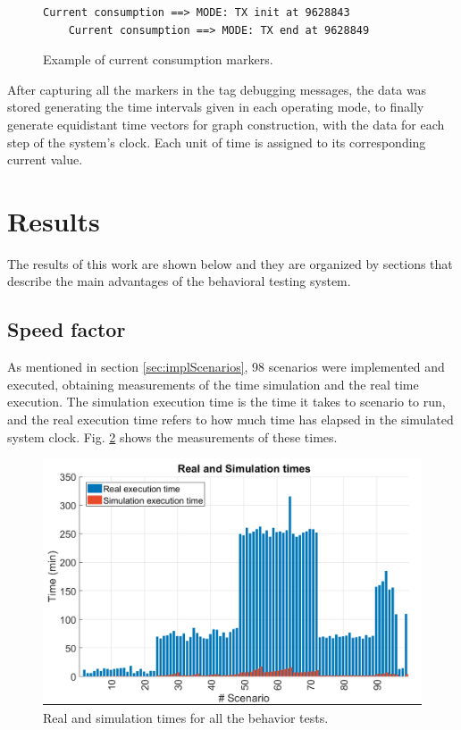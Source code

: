 \documentclass[journal]{IEEEtran}	%
\begin{document}
\begin{figure}[t!]
\centering
\begin{lstlisting}[style=scenarioStyle]
    Current consumption ==> MODE: TX init at 9628843
    Current consumption ==> MODE: TX end at 9628849
\end{lstlisting}
\caption{Example of current consumption markers.}
\label{fig:markers}
\end{figure}

After capturing all the markers in the tag debugging messages, the data was stored generating the time intervals given in each operating mode, to finally generate equidistant time vectors for graph construction, with the data for each step of the system's clock. Each unit of time is assigned to its corresponding current value.


\section{Results}


The results of this work are shown below and they are organized by sections that describe the main advantages of the behavioral testing system.


\subsection{Speed factor}


As mentioned in section \ref{sec:implScenarios}, 98 scenarios were implemented and executed, obtaining measurements of the time simulation and the real time execution. The simulation execution time is the time it takes to scenario to run, and the real execution time refers to how much time has elapsed in the simulated system clock. Fig. \ref{fig:scenarios1} shows the measurements of these times.

\begin{figure}[t!]
\centering
\includegraphics[width=0.95\columnwidth]{scenarios4.png}
\caption{Real and simulation times for all the behavior tests.}
\label{fig:scenarios1}
\end{figure}
\end{document}
